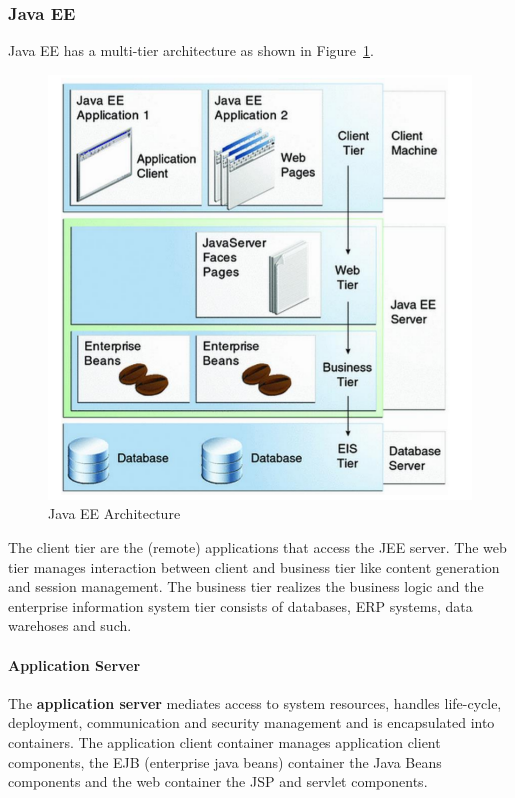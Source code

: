 \subsubsection{Java EE}
Java EE has a multi-tier architecture as shown in Figure~\ref{fig:java_ee}.
\begin{figure}[h]
  \centering
  \includegraphics[width=.6\textwidth]{images/java_ee.png}
  \caption{Java EE Architecture}\label{fig:java_ee}
\end{figure}
The client tier are the (remote) applications that access the JEE server.
The web tier manages interaction between client and business tier like content generation and session management.
The business tier realizes the business logic and the enterprise information system tier consists of databases, ERP systems, data warehoses and such.\\

\paragraph{Application Server}
The \textbf{application server} mediates access to system resources, handles life-cycle, deployment, communication and security management and is encapsulated into containers.
The application client container manages application client components, the EJB (enterprise java beans) container the Java Beans components and the web container the JSP and servlet components.\\

